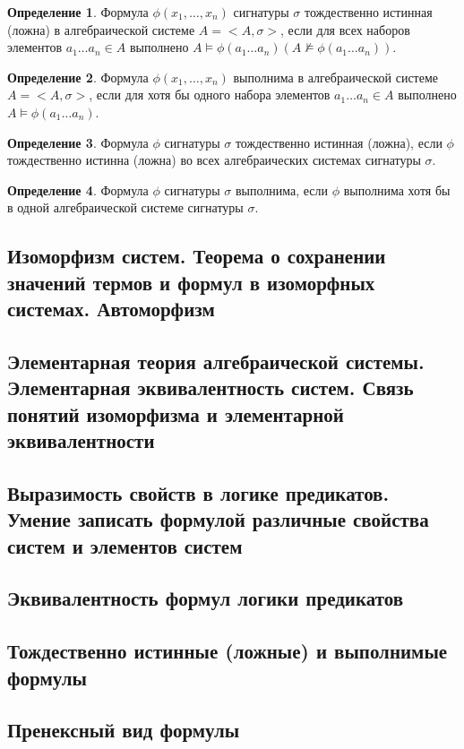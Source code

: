 \documentclass[a4paper]{article}
\theoremstyle{definition}
\newtheorem*{definition}{Определение}
\theoremstyle{remark}
\begin{document}
    \begin{definition}
        Формула $\phi(x_1, \dots, x_n)$ сигнатуры $\sigma$ тождественно истинная (ложна) в алгебраической 
системе $A = <A, \sigma>$, если для всех наборов элементов $a_1\dots a_n \in A$ выполнено 
$A \models \phi(a_1\dots a_n) (A \not\models \phi(a_1\dots a_n)).$
    \end{definition}
    \begin{definition}
        Формула $\phi(x_1, \dots, x_n)$ выполнима в алгебраической системе 
$A = <A, \sigma>$, если для хотя бы одного набора элементов $a_1\dots a_n \in A $ выполнено 
$A \models \phi(a_1\dots a_n)$.
    \end{definition}
    \begin{definition}
        Формула $\phi$ сигнатуры $\sigma $ тождественно истинная (ложна), если $\phi$ тождественно истинна 
(ложна) во всех алгебраических системах сигнатуры $\sigma$. 
    \end{definition}
    \begin{definition}
        Формула $\phi$ сигнатуры $\sigma$ выполнима, 
если $\phi$ выполнима хотя бы в одной алгебраической системе сигнатуры $\sigma$. 
    \end{definition}
    \subsection{Изоморфизм систем. Теорема о сохранении значений термов и формул в изоморфных системах. Автоморфизм}
    \subsection{Элементарная теория алгебраической системы. Элементарная эквивалентность систем. Связь понятий изоморфизма и элементарной эквивалентности}
    \subsection{Выразимость свойств в логике предикатов. Умение записать формулой различные свойства систем и элементов систем}
    \subsection{Эквивалентность формул логики предикатов}
    \subsection{Тождественно истинные (ложные) и выполнимые формулы}
    \subsection{Пренексный вид формулы}
\end{document}

